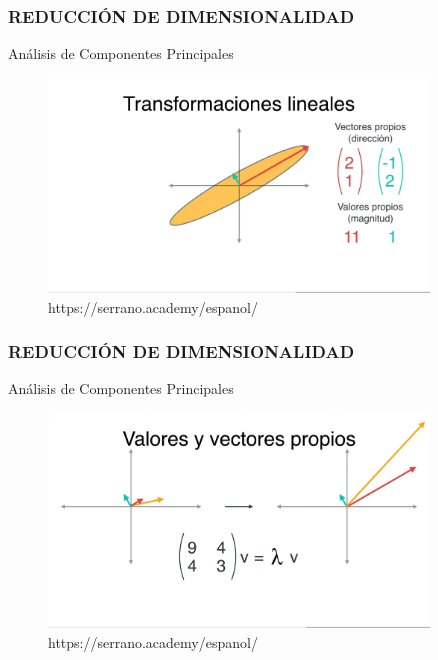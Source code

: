 \documentclass{beamer}
\begin{document}
\begin{frame}
	\frametitle{REDUCCIÓN DE DIMENSIONALIDAD}
	\begin{block}{Análisis de Componentes Principales}	
		\begin{figure}
			\includegraphics[width=0.9\textwidth]{PCA/IMG_3578.jpg}
			\caption{https://serrano.academy/espanol/}
		\end{figure}
	\end{block}
\end{frame}

\begin{frame}
	\frametitle{REDUCCIÓN DE DIMENSIONALIDAD}
	\begin{block}{Análisis de Componentes Principales}	
		\begin{figure}
			\includegraphics[width=0.9\textwidth]{PCA/IMG_3579.jpg}
			\caption{https://serrano.academy/espanol/}
		\end{figure}
	\end{block}
\end{frame}
\end{document}
